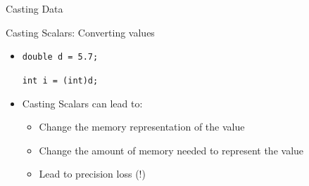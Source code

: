 \begin{Coupe}
\begin{frame}{Casting Data}
  \begin{block}{Casting Scalars: Converting values}
    \begin{itemize}\vspace{-.2\baselineskip}
    \item \texttt{double d = 5.7;} ~~~~

      \texttt{int i = (int)d;} ~~~~

    \item<2-> Casting Scalars can lead to:
      \begin{itemize}
      \item Change the memory representation of the value
      \item Change the amount of memory needed to represent the value
      \item Lead to precision loss (!)
      \end{itemize}
    \end{itemize}
  \end{block}\vspace{-.5\baselineskip}


\end{frame}
\end{Coupe}

